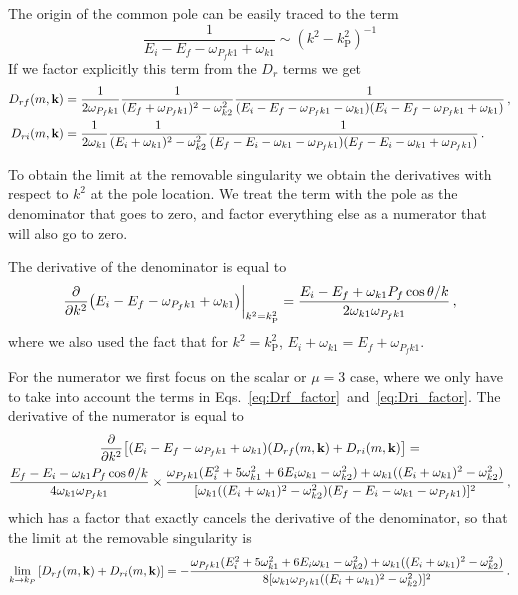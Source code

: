 \documentclass[aps,prd,onecolumn,groupedaddress]{revtex4-2}
\begin{document}
The origin of the common pole can be easily traced to the term
\begin{equation}
    \frac{1}{E_i-E_f-\omega_{P_fk1}+\omega_{k1}}\sim (k^2-k_{\text{P}}^2)^{-1}
\end{equation}
If we factor explicitly this term from the $D_r$ terms we get
\begin{align}
    D_{rf}(m, \textbf k) &=
\frac{1}{2 \omega_{P_fk1}}
\frac{1}
  { ( E_f+\omega_{P_fk1})^2 - \omega_{k2}^2  }
\frac{ 1} 
{  (E_i-E_f-\omega_{P_fk1} - \omega_{k1} )(E_i-E_f-\omega_{P_fk1} + \omega_{k1})  } \,, \label{eq:Drf_factor}\\
D_{ri}(m, \textbf k) &=
\frac{1}{2 \omega_{k1}}
\frac{1}
  { ( E_i+\omega_{k1})^2 - \omega_{k2}^2   } 
\frac{ 1} 
{  (E_f-E_i-\omega_{k1}  - \omega_{P_fk1} )(E_f-E_i-\omega_{k1}  + \omega_{P_fk1})   }  \,. \label{eq:Dri_factor}
\end{align}

To obtain the limit at the removable singularity we obtain the derivatives with respect to $k^2$ at the pole location.
We treat the term with the pole as the denominator that goes to zero, and factor everything else as a numerator that will also go to zero.

The derivative of the denominator is equal to
\begin{equation}
    \pdv{k^{2}}(E_i-E_f-\omega_{P_fk1}+\omega_{k1})\bigg|_{k^2=k^2_\text{P}}
    = \frac{E_i-E_f+\omega_{k1}P_f\cos\theta/k}{2\omega_{k1}\omega_{P_fk1}}\,,
\end{equation}
where we also used the fact that for $k^2=k^2_\text{P}$, $E_i+\omega_{k1}=E_f+\omega_{P_fk1}$.


For the numerator we first focus on the scalar or $\mu=3$ case, where we only have to take into account the terms in Eqs.~\eqref{eq:Drf_factor}~and~\eqref{eq:Dri_factor}.
The derivative of the numerator is equal to
\begin{multline}
    \pdv{k^{2}}\qty[(E_i-E_f-\omega_{P_fk1}+\omega_{k1})(D_{rf}(m, \mathbf k)+ D_{ri}(m, \mathbf k)]=\\
    \frac{E_f-E_i-\omega_{k1}P_f\cos\theta/k}{4\omega_{k1}\omega_{P_fk1}}
    \times
    \frac{\omega_{P_fk1}(E_i^2+5\omega_{k1}^2+6E_i\omega_{k1}-\omega_{k2}^2)+\omega_{k1}((E_i+\omega_{k1})^2-\omega_{k2}^2)}
    {[\omega_{k1}
    ((E_i+\omega_{k1})^2 - \omega_{k2}^2)
    (E_f-E_i-\omega_{k1} - \omega_{P_fk1})]^2}\,,
\end{multline}
which has a factor that exactly cancels the derivative of the denominator, so that the limit at the removable singularity is
\begin{equation}
    \lim_{k\to k_P}
    \qty[D_{rf}(m, \mathbf k)+ D_{ri}(m, \mathbf k)]
    = -
    \frac{\omega_{P_fk1}(E_i^2+5\omega_{k1}^2+6E_i\omega_{k1}-\omega_{k2}^2)+\omega_{k1}((E_i+\omega_{k1})^2-\omega_{k2}^2)}
    {8[\omega_{k1}\omega_{P_fk1}
    ((E_i+\omega_{k1})^2 - \omega_{k2}^2)]^2}\,.
\end{equation}
\end{document}
